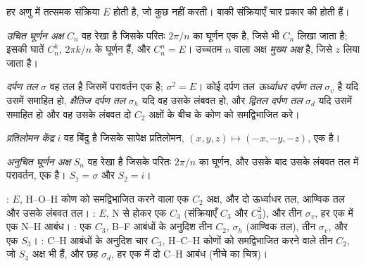 हर अणु में तत्समक संक्रिया $E$ होती है, जो कुछ नहीं करती। बाकी
संक्रियाएँ चार प्रकार की होती हैं।

\begin{definition}[उचित घूर्णन अक्ष, मुख्य अक्ष]\label{def:b3:point-groups:rotation}
\emph{उचित घूर्णन अक्ष} $C_n$ वह रेखा है
जिसके परितः $2\pi/n$ का घूर्णन एक  है, जिसे भी
$C_n$ लिखा जाता है; इसकी घातें $C_n^k$, $2\pi k/n$ के घूर्णन हैं, और $C_n^n = E$।
उच्चतम $n$ वाला अक्ष \emph{मुख्य अक्ष} है, जिसे
$z$ लिया जाता है।
\end{definition}

\begin{definition}[दर्पण तल]\label{def:b3:point-groups:mirror}
\emph{दर्पण तल} $\sigma$ वह तल है जिसमें
परावर्तन एक  है; $\sigma^2 = E$। कोई दर्पण तल
\emph{ऊर्ध्वाधर दर्पण तल} $\sigma_v$ है यदि उसमें
 समाहित हो, \emph{क्षैतिज दर्पण
तल} $\sigma_h$ यदि वह उसके लंबवत
हो, और \emph{द्वितल दर्पण तल}
$\sigma_d$ यदि उसमें  समाहित हो और वह उसके लंबवत दो $C_2$ अक्षों के
बीच के कोण को समद्विभाजित करे।
\end{definition}

\begin{definition}[प्रतिलोमन केंद्र]\label{def:b3:point-groups:inversion}
\emph{प्रतिलोमन केंद्र} $i$ वह बिंदु है
जिसके सापेक्ष प्रतिलोमन, $(x, y, z) \mapsto (-x, -y, -z)$, एक  है।
\end{definition}

\begin{definition}[अनुचित घूर्णन अक्ष]\label{def:b3:point-groups:improper}
\emph{अनुचित घूर्णन अक्ष} $S_n$ वह
रेखा है जिसके परितः $2\pi/n$ का घूर्णन, और उसके बाद उसके लंबवत
तल में परावर्तन, एक  है। $S_1 = \sigma$ और $S_2 = i$।
\end{definition}

\begin{example}[चार अणुओं के तत्व]\label{ex:b3:point-groups:elements}
: $E$, H--O--H कोण को समद्विभाजित करने वाला एक $C_2$ अक्ष, और दो ऊर्ध्वाधर
तल, आण्विक तल और उसके लंबवत तल। :
$E$, N से होकर एक $C_3$ (संक्रियाएँ $C_3$ और $C_3^2$), और तीन $\sigma_v$, हर एक में
एक N--H आबंध। : एक $C_3$, B--F आबंधों के अनुदिश तीन $C_2$,
$\sigma_h$ (आण्विक तल), तीन $\sigma_v$, और एक $S_3$। : C--H आबंधों के
अनुदिश चार $C_3$, H--C--H कोणों को समद्विभाजित करने वाले तीन $C_2$, जो
$S_4$ अक्ष भी हैं, और छह $\sigma_d$, हर एक में दो C--H आबंध
(नीचे का चित्र)।
\end{example}

